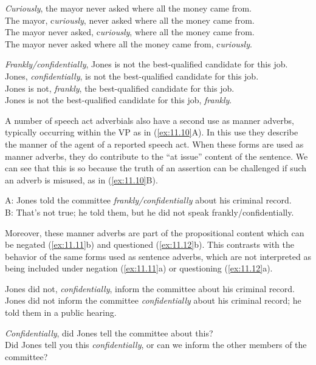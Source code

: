 \ea \label{ex:11.8}
\ea \textit{Curiously}, the mayor never asked where all the money came from.\\
\ex The mayor, c\textit{uriously}, never asked where all the money came from.\\
\ex The mayor never asked, c\textit{uriously}, where all the money came from.\\
\ex The mayor never asked where all the money came from, c\textit{uriously}.
                       \z
\z

\ea \label{ex:11.9}
\ea \textit{Frankly/confidentially}, Jones is not the best-qualified candidate for this job.\\
\ex Jones, \textit{confidentially}, is not the best-qualified candidate for this job.\\
\ex Jones is not, \textit{frankly}, the best-qualified candidate for this job.\\
\ex Jones is not the best-qualified candidate for this job, \textit{frankly}.
                       \z
\z


A number of speech act adverbials also have a second use as manner adverbs, typically occurring within the VP as in (\ref{ex:11.10}A). In this use they describe the manner of the agent of a reported speech act. When these forms are used as manner adverbs, they do contribute to the “at issue” content of the sentence. We can see that this is so because the truth of an assertion can be challenged if such an adverb is misused, as in (\ref{ex:11.10}B).


\ea \label{ex:11.10}
A: Jones told the committee \textit{frankly/confidentially} about his criminal record.\\
B: That’s not true; he told them, but he did not speak frankly/confidentially.
\z


Moreover, these manner adverbs are part of the propositional content which can be negated (\ref{ex:11.11}b) and questioned (\ref{ex:11.12}b). This contrasts with the behavior of the same forms used as sentence adverbs, which are not interpreted as being included under negation (\ref{ex:11.11}a) or questioning (\ref{ex:11.12}a).


\ea \label{ex:11.11}
\ea Jones did not, \textit{confidentially}, inform the committee about his criminal record.\\
\ex Jones did not inform the committee \textit{confidentially} about his criminal record; he told them in a public hearing.
                       \z
\z

\ea \label{ex:11.12}
\ea \textit{Confidentially}, did Jones tell the committee about this?\\
\ex Did Jones tell you this \textit{confidentially}, or can we inform the other members   of the committee?
                       \z
\z


